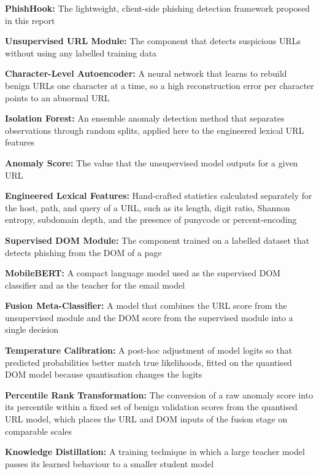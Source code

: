 \documentclass{FastFyp}
\begin{document}
\noindent\textbf{PhishHook:} The lightweight, client-side phishing detection framework proposed in this report\par\medskip
\noindent\textbf{Unsupervised URL Module:} The component that detects suspicious URLs without using any labelled training data\par\medskip
\noindent\textbf{Character-Level Autoencoder:} A neural network that learns to rebuild benign URLs one character at a time, so a high reconstruction error per character points to an abnormal URL\par\medskip
\noindent\textbf{Isolation Forest:} An ensemble anomaly detection method that separates observations through random splits, applied here to the engineered lexical URL features\par\medskip
\noindent\textbf{Anomaly Score:} The value that the unsupervised model outputs for a given URL\par\medskip
\noindent\textbf{Engineered Lexical Features:} Hand-crafted statistics calculated separately for the host, path, and query of a URL, such as its length, digit ratio, Shannon entropy, subdomain depth, and the presence of punycode or percent-encoding\par\medskip
\noindent\textbf{Supervised DOM Module:} The component trained on a labelled dataset that detects phishing from the DOM of a page\par\medskip
\noindent\textbf{MobileBERT:} A compact language model used as the supervised DOM classifier and as the teacher for the email model\par\medskip
\noindent\textbf{Fusion Meta-Classifier:} A model that combines the URL score from the unsupervised module and the DOM score from the supervised module into a single decision\par\medskip
\noindent\textbf{Temperature Calibration:} A post-hoc adjustment of model logits so that predicted probabilities better match true likelihoods, fitted on the quantised DOM model because quantisation changes the logits\par\medskip
\noindent\textbf{Percentile Rank Transformation:} The conversion of a raw anomaly score into its percentile within a fixed set of benign validation scores from the quantised URL model, which places the URL and DOM inputs of the fusion stage on comparable scales\par\medskip
\noindent\textbf{Knowledge Distillation:} A training technique in which a large teacher model passes its learned behaviour to a smaller student model\par\medskip
\end{document}
